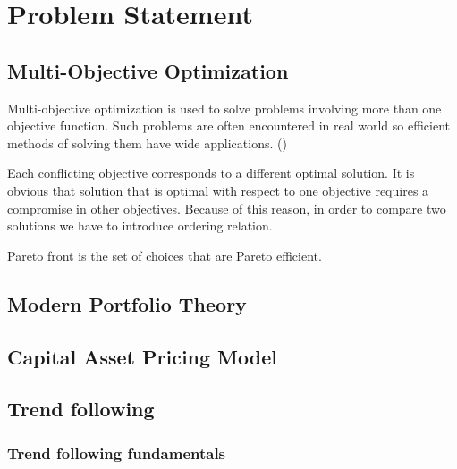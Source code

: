 \chapter{Problem Statement}
\label{cha:multiObjectiveOptimization}




\section{Multi-Objective Optimization}
\label{sec:strukturaDokumentu}

Multi-objective optimization is used to solve problems involving more than one objective function.
Such problems are often encountered in real world so efficient methods of solving them have wide applications.
(\cite{Deb:2001:MOU:559152})


Each conflicting objective corresponds to a different optimal solution.  
It is obvious that solution that is optimal with respect to one objective requires a compromise in other objectives.
Because of this reason, in order to compare two solutions we have to introduce ordering relation.

Pareto front is the set of choices that are Pareto efficient. 


\section{Modern Portfolio Theory}


\section{Capital Asset Pricing Model}



\section{Trend following}
\label{sec:trendFollowing}

\subsection{Trend following fundamentals}
\label{sec:trend_following_fundamentals}


